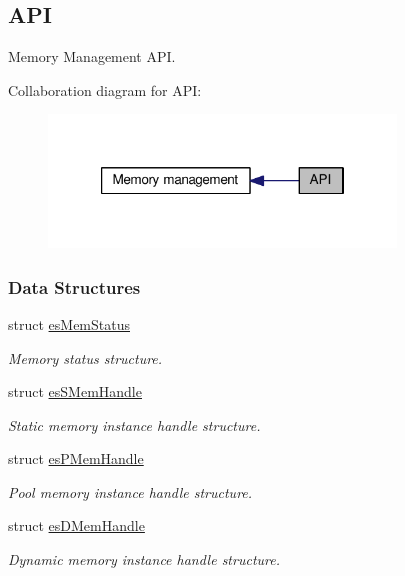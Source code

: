 \hypertarget{group__mem__intf}{\subsection{A\-P\-I}
\label{group__mem__intf}
}


Memory Management A\-P\-I.  


Collaboration diagram for A\-P\-I\-:\nopagebreak
\begin{figure}[H]
\begin{center}
\leavevmode
\includegraphics[width=262pt]{group__mem__intf}
\end{center}
\end{figure}
\subsubsection*{Data Structures}
\begin{DoxyCompactItemize}
\item 
struct \hyperlink{structesMemStatus}{es\-Mem\-Status}
\begin{DoxyCompactList}\small\item\em Memory status structure. \end{DoxyCompactList}\item 
struct \hyperlink{structesSMemHandle}{es\-S\-Mem\-Handle}
\begin{DoxyCompactList}\small\item\em Static memory instance handle structure. \end{DoxyCompactList}\item 
struct \hyperlink{structesPMemHandle}{es\-P\-Mem\-Handle}
\begin{DoxyCompactList}\small\item\em Pool memory instance handle structure. \end{DoxyCompactList}\item 
struct \hyperlink{structesDMemHandle}{es\-D\-Mem\-Handle}
\begin{DoxyCompactList}\small\item\em Dynamic memory instance handle structure. \end{DoxyCompactList}\end{DoxyCompactItemize}
